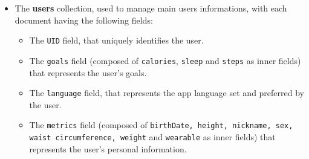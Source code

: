 \begin{itemize}[nosep] %
    \item The \textbf{users} collection, used to manage main users informations, with each document having the following fields:
    \label{subsubsec:usersCollection}
    \begin{itemize}[nosep]
        \item The \texttt{UID} field, that uniquely identifies the user.
        \item The \texttt{goals} field (composed of \texttt{calories}, \texttt{sleep} and \texttt{steps} as inner fields) that represents the user's goals.
        \item The \texttt{language} field, that represents the app language set and preferred by the user.
        \item The \texttt{metrics} field (composed of \texttt{birthDate, height, nickname, sex, waist circumference, weight} and \texttt{wearable} as inner fields) that represents the user's personal information.
    \end{itemize}
\end{itemize}


